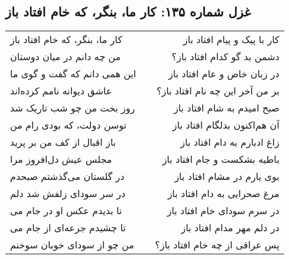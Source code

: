 \begin{center}
\section*{غزل شماره ۱۳۵: کار ما، بنگر، که خام افتاد باز}
\label{sec:135}
\begin{longtable}{l p{0.5cm} r}
کار ما، بنگر، که خام افتاد باز
&&
کار با پیک و پیام افتاد باز
\\
من چه دانم در میان دوستان
&&
دشمن بد گو کدام افتاد باز؟
\\
این همی دانم که گفت و گوی ما
&&
در زبان خاص و عام افتاد باز
\\
عاشق دیوانه نامم کرده‌اند
&&
بر من آخر این چه نام افتاد باز؟
\\
روز بخت من چو شب تاریک شد
&&
صبح امیدم به شام افتاد باز
\\
توسن دولت، که بودی رام من
&&
آن هم‌اکنون بدلگام افتاد باز
\\
باز اقبال از کف من بر پرید
&&
زاغ ادبارم به دام افتاد باز
\\
مجلس عیش دل‌افروز مرا
&&
باطیه بشکست و جام افتاد باز
\\
در گلستان می‌گذشتم صبحدم
&&
بوی یارم در مشام افتاد باز
\\
در سر سودای زلفش شد دلم
&&
مرغ صحرایی به دام افتاد باز
\\
تا بدیدم عکس او در جام می
&&
در سرم سودای خام افتاد باز
\\
تا چشیدم جرعه‌ای از جام می
&&
در دلم مهر مدام افتاد باز
\\
من چو از سودای خوبان سوختم
&&
پس عراقی از چه خام افتاد باز؟
\\
\end{longtable}
\end{center}
